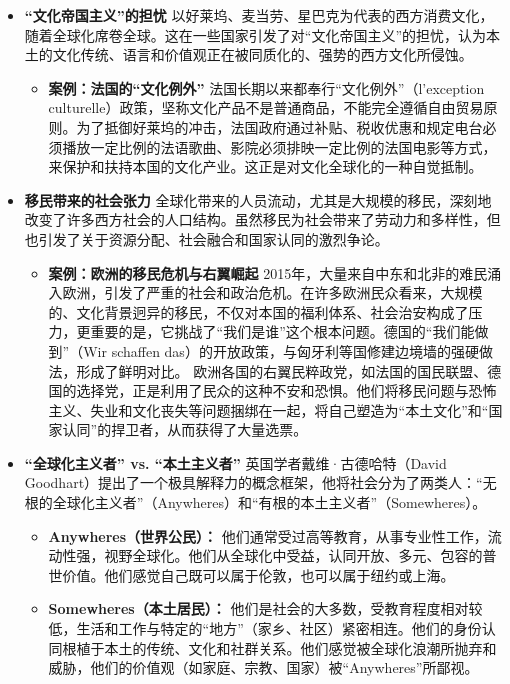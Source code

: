 \begin{itemize}
\item \textbf{“文化帝国主义”的担忧}
以好莱坞、麦当劳、星巴克为代表的西方消费文化，随着全球化席卷全球。这在一些国家引发了对“文化帝国主义”的担忧，认为本土的文化传统、语言和价值观正在被同质化的、强势的西方文化所侵蚀。
\begin{itemize}
\item \textbf{案例：法国的“文化例外”}
法国长期以来都奉行“文化例外”（l'exception culturelle）政策，坚称文化产品不是普通商品，不能完全遵循自由贸易原则。为了抵御好莱坞的冲击，法国政府通过补贴、税收优惠和规定电台必须播放一定比例的法语歌曲、影院必须排映一定比例的法国电影等方式，来保护和扶持本国的文化产业。这正是对文化全球化的一种自觉抵制。
\end{itemize}

\item \textbf{移民带来的社会张力}
全球化带来的人员流动，尤其是大规模的移民，深刻地改变了许多西方社会的人口结构。虽然移民为社会带来了劳动力和多样性，但也引发了关于资源分配、社会融合和国家认同的激烈争论。
\begin{itemize}
\item \textbf{案例：欧洲的移民危机与右翼崛起}
2015年，大量来自中东和北非的难民涌入欧洲，引发了严重的社会和政治危机。在许多欧洲民众看来，大规模的、文化背景迥异的移民，不仅对本国的福利体系、社会治安构成了压力，更重要的是，它挑战了“我们是谁”这个根本问题。德国的“我们能做到”（Wir schaffen das）的开放政策，与匈牙利等国修建边境墙的强硬做法，形成了鲜明对比。
欧洲各国的右翼民粹政党，如法国的国民联盟、德国的选择党，正是利用了民众的这种不安和恐惧。他们将移民问题与恐怖主义、失业和文化丧失等问题捆绑在一起，将自己塑造为“本土文化”和“国家认同”的捍卫者，从而获得了大量选票。
\end{itemize}

\item \textbf{“全球化主义者” vs. “本土主义者”}
英国学者戴维·古德哈特（David Goodhart）提出了一个极具解释力的概念框架，他将社会分为了两类人：“无根的全球化主义者”（Anywheres）和“有根的本土主义者”（Somewheres）。
\begin{itemize}
\item \textbf{Anywheres（世界公民）：} 他们通常受过高等教育，从事专业性工作，流动性强，视野全球化。他们从全球化中受益，认同开放、多元、包容的普世价值。他们感觉自己既可以属于伦敦，也可以属于纽约或上海。
\item \textbf{Somewheres（本土居民）：} 他们是社会的大多数，受教育程度相对较低，生活和工作与特定的“地方”（家乡、社区）紧密相连。他们的身份认同根植于本土的传统、文化和社群关系。他们感觉被全球化浪潮所抛弃和威胁，他们的价值观（如家庭、宗教、国家）被“Anywheres”所鄙视。
\end{itemize}
\end{itemize}


